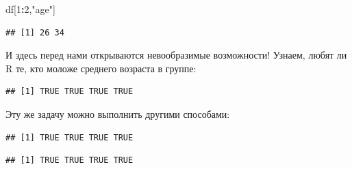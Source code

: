 \documentclass[
]{book}
\newenvironment{Shaded}{\begin{snugshade}}{\end{snugshade}}
\newcommand{\DecValTok}[1]{\textcolor[rgb]{0.00,0.00,0.81}{#1}}
\newcommand{\KeywordTok}[1]{\textcolor[rgb]{0.13,0.29,0.53}{\textbf{#1}}}
\newcommand{\NormalTok}[1]{#1}
\newcommand{\OperatorTok}[1]{\textcolor[rgb]{0.81,0.36,0.00}{\textbf{#1}}}
\newcommand{\StringTok}[1]{\textcolor[rgb]{0.31,0.60,0.02}{#1}}
\begin{document}
\begin{Shaded}
\begin{Highlighting}[]
\NormalTok{df[}\DecValTok{1}\OperatorTok{:}\DecValTok{2}\NormalTok{,}\StringTok{"age"}\NormalTok{]}
\end{Highlighting}
\end{Shaded}

\begin{verbatim}
## [1] 26 34
\end{verbatim}

И здесь перед нами открываются невообразимые возможности! Узнаем, любят ли R те, кто моложе среднего возраста в группе:

\begin{Shaded}
\end{Shaded}

\begin{verbatim}
## [1] TRUE TRUE TRUE TRUE
\end{verbatim}

Эту же задачу можно выполнить другими способами:

\begin{Shaded}
\end{Shaded}

\begin{verbatim}
## [1] TRUE TRUE TRUE TRUE
\end{verbatim}

\begin{Shaded}
\end{Shaded}

\begin{verbatim}
## [1] TRUE TRUE TRUE TRUE
\end{verbatim}
\end{document}
